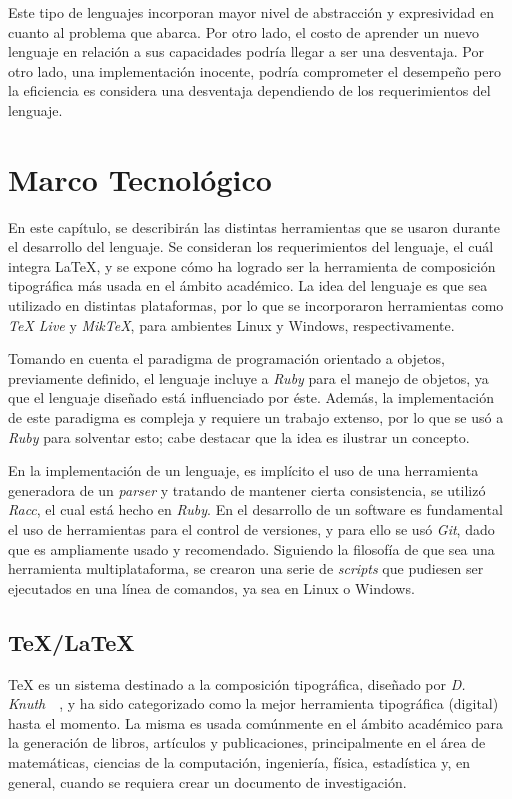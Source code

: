 \documentclass[12pt,letterpaper,titlepage,oneside,openright]{book}
\newcommand{\latex}{\LaTeX\xspace}
\newcommand{\tex}{\TeX\xspace}
\newcommand{\ruby}{\textit{Ruby}\xspace}
\begin{document}
Este tipo de lenguajes incorporan mayor nivel de abstracción y expresividad en cuanto al problema que abarca. Por otro lado, el costo de aprender un nuevo lenguaje en relación a sus capacidades podría llegar a ser una desventaja. Por otro lado, una implementación inocente, podría comprometer el desempeño pero la eficiencia es considera una desventaja dependiendo de los requerimientos del lenguaje.

\chapter{Marco Tecnológico}

En este capítulo, se describirán las distintas herramientas que se usaron durante
el desarrollo del lenguaje. Se consideran los requerimientos del lenguaje, el cuál
integra \latex, y se expone cómo ha logrado ser la herramienta de composición tipográfica más usada en el ámbito
académico. La idea del lenguaje es que sea utilizado en distintas plataformas, por lo
que se incorporaron herramientas como \textit{TeX Live} y \textit{MikTeX}, para
ambientes Linux y Windows, respectivamente.

Tomando en cuenta el paradigma
de programación orientado a objetos, previamente definido, el lenguaje incluye a \ruby para el
manejo de objetos, ya que el lenguaje diseñado está influenciado por éste.
Además, la implementación de este paradigma es compleja y requiere un trabajo
extenso, por lo que se usó a \ruby para solventar esto; cabe destacar que la idea es
ilustrar un concepto.

En la implementación de un lenguaje, es implícito el uso de una
herramienta generadora de un \textit{parser} y tratando de mantener cierta
consistencia, se utilizó \textit{Racc}, el cual está hecho en \ruby. En el desarrollo
de un software es fundamental el uso de herramientas para el control de versiones, y
para ello se usó \textit{Git}, dado que es ampliamente usado y recomendado.
Siguiendo la filosofía de que sea una herramienta multiplataforma, se crearon una
serie de \textit{scripts} que pudiesen ser ejecutados en una línea de comandos, ya sea
en Linux o Windows.

\section{\tex/\latex}

\tex es un sistema destinado a la composición tipográfica, diseñado por \textit{D. Knuth}~\cite{knuth1984texbook}~\cite{weblatex}, y ha sido categorizado como la mejor herramienta tipográfica (digital) hasta el momento. La misma es usada comúnmente en el ámbito académico para la generación de libros, artículos y publicaciones, principalmente en el área de matemáticas, ciencias de la computación, ingeniería, física, estadística y, en general, cuando se requiera crear un documento de investigación.
\end{document}

